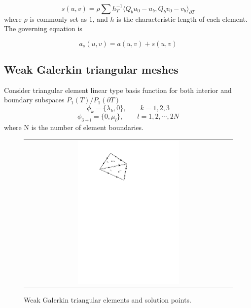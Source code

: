 \begin{equation}
s(u, v) = \rho \sum h_{T}^{-1} \langle Q_{b} u_{0} - u_{b}, Q_{b} v_{0} - v_{b} \rangle_{\partial T}
\end{equation}
where $ \rho $ is commonly set as $ 1 $, and $ h $ is the characteristic length of each element. The governing equation is 

\begin{equation}
a_{s} (u, v) = a(u, v) + s(u, v)
\end{equation}

\subsection{Weak Galerkin triangular meshes}

Consider triangular element linear type basis function for both interior and boundary subspaces $ P_{1}(T) / P_{1} (\partial T) $
\begin{equation}
\phi_{k} = \{ \lambda_{k}, 0 \}, \qquad k = 1,2, 3
\end{equation}
\begin{equation}
\phi_{3 + l} = \{ 0, \mu_{l} \}, \qquad l = 1, 2, \cdots , 2N
\end{equation}
where N is the number of element boundaries.

\begin{figure}[h]
	\centering
	\begin{tabular}{c}
		\includegraphics[width=0.5\textwidth]{./pics/triangle.pdf}
	\end{tabular}
	\caption{\footnotesize Weak Galerkin triangular elements and solution points.}\label{fig1: triangle}
\end{figure}

